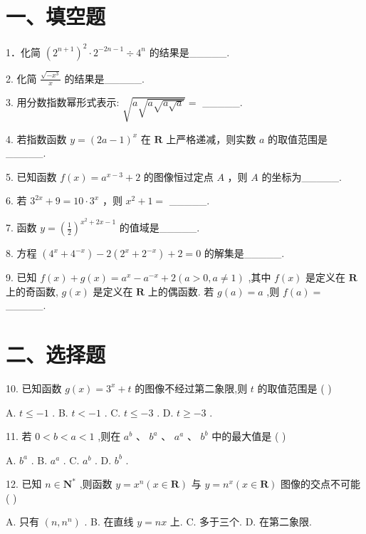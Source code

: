 \section*{一、填空题}

1．化简 ${\left( {2}^{n + 1}\right) }^{2} \cdot  {2}^{-{2n} - 1} \div  {4}^{n}$ 的结果是\_\_\_\_\_.

2. 化简 $\frac{\sqrt{-{x}^{3}}}{x}$ 的结果是\_\_\_\_\_.

3. 用分数指数幂形式表示: $\sqrt{a\sqrt{a\sqrt{a\sqrt{a}}}} =$ \_\_\_\_\_.

4. 若指数函数 $y = {\left( 2a - 1\right) }^{x}$ 在 $\mathbf{R}$ 上严格递减，则实数 $a$ 的取值范围是\_\_\_\_\_.

5. 已知函数 $f\left( x\right)  = {a}^{x - 3} + 2$ 的图像恒过定点 $A$ ，则 $A$ 的坐标为\_\_\_\_\_.

6. 若 ${3}^{2x} + 9 = {10} \cdot  {3}^{x}$ ，则 ${x}^{2} + 1 =$ \_\_\_\_\_.

7. 函数 $y = {\left( \frac{1}{2}\right) }^{{x}^{2} + {2x} - 1}$ 的值域是\_\_\_\_\_.

8. 方程 $\left( {{4}^{x} + {4}^{-x}}\right)  - 2\left( {{2}^{x} + {2}^{-x}}\right)  + 2 = 0$ 的解集是\_\_\_\_\_.

9. 已知 $f\left( x\right)  + g\left( x\right)  = {a}^{x} - {a}^{-x} + 2\left( {a > 0,a \neq  1}\right)$ ,其中 $f\left( x\right)$ 是定义在 $\mathbf{R}$ 上的奇函数, $g\left( x\right)$ 是定义在 $\mathbf{R}$ 上的偶函数. 若 $g\left( a\right)  = a$ ,则 $f\left( a\right)  =$ \_\_\_\_\_.

\section*{二、选择题}

10. 已知函数 $g\left( x\right)  = {3}^{x} + t$ 的图像不经过第二象限,则 $t$ 的取值范围是 ( )

A. $t \leq   - 1$ . B. $t <  - 1$ . C. $t \leq   - 3$ . D. $t \geq   - 3$ .

11. 若 $0 < b < a < 1$ ,则在 ${a}^{b}$ 、 ${b}^{a}$ 、 ${a}^{a}$ 、 ${b}^{b}$ 中的最大值是 ( )

A. ${b}^{a}$ . B. ${a}^{a}$ . C. ${a}^{b}$ . D. ${b}^{b}$ .

12. 已知 $n \in  {\mathbf{N}}^{ * }$ ,则函数 $y = {x}^{n}\left( {x \in  \mathbf{R}}\right)$ 与 $y = {n}^{x}\left( {x \in  \mathbf{R}}\right)$ 图像的交点不可能 ( )

A. 只有 $\left( {n,{n}^{n}}\right)$ . B. 在直线 $y = {nx}$ 上. C. 多于三个. D. 在第二象限.

